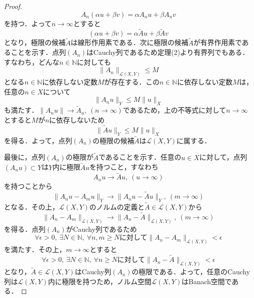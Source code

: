 \documentclass[11pt,a4paper,titlepage]{jsreport}
\theoremstyle{definition}
\begin{document}
\begin{proof}
  \begin{equation*}
    A_n(\alpha u+\beta v) = \alpha A_n u + \beta A_n v
  \end{equation*}
  を持つ．よって$n\rightarrow \infty$とすると
  \begin{equation*}
    (\alpha u+\beta v)=\alpha \tilde{A} u + \beta \tilde{A} v
  \end{equation*}
  となり，極限の候補$\tilde{A}$は線形作用素である．次に極限の候補$\tilde{A}$が有界作用素であることを示す．点列$(A_n)$はCauchy列であるため定理(2)より有界列でもある．すなわち，どんな$n\in \mathbb{N}$に対しても
  \begin{equation*}
    \|A_n\|_{\mathcal{L}(X,Y)} \leq M
  \end{equation*}
  となる$n\in\mathbb{N}$に依存しない定数$M$が存在する．この$n\in\mathbb{N}$に依存しない定数$M$は，任意の$n\in X$について
  \begin{equation*}
    \|A_nu\|_Y \leq M\|u\|_X
  \end{equation*}
  も満たす．$\|A_nu\|\rightarrow\tilde{A}_u,\ (n\rightarrow \infty)$であるため，上の不等式に対して$n\rightarrow \infty$とすると$M$が$n$に依存しないため
  \begin{equation*}
    \|\tilde{A}u\|_Y \leq M\|u\|_X
  \end{equation*}
  を得る．よって，点列$(A_n)$の極限の候補$\tilde{A}$は$\mathcal{L}(X,Y)$に属する．

  最後に，点列$(A_n)$の極限が$\tilde{A}$であることを示す．任意の$u\in X$に対して，点列$(A_nu)\subset Y$は$Y$内に極限$\tilde{A}u$を持つこと，すなわち
  \begin{equation*}
    A_nu\rightarrow \tilde{A}u,\ (u\rightarrow \infty)
  \end{equation*}
  を持つことから
  \begin{equation*}
    \|A_n u- A_m u\|_Y\rightarrow \|A_n u-\tilde{A}u\|_Y,\ (m\rightarrow \infty)
  \end{equation*}
  となる．その上，$\mathcal{L}(X,Y)$のノルムの定義と$\tilde{A}\in\mathcal{L}(X,Y)$から
  \begin{equation*}
    \|A_n-A_m\|_{\mathcal{L}(X,Y)}\rightarrow\|A_n-\tilde{A}\|_{\mathcal{L}(X,Y)},\ (m\rightarrow \infty)
  \end{equation*}
  を得る．点列$(A_n)$がCauchy列であるため
  \begin{equation*}
    \forall \epsilon >0,\ \exists N\in\mathbb{N},\ \forall n,m\geq N に対して\|A_n-A_m\|_{\mathcal{L}(X,Y)}<\epsilon
  \end{equation*}
  を満たす．その上，$m\rightarrow \infty$とすると
  \begin{equation*}
    \forall \epsilon >0,\ \exists N\in\mathbb{N},\ \forall n\geq N に対して\|A_n-\tilde{A}\|_{\mathcal{L}(X,Y)}<\epsilon
  \end{equation*}
  となり，$\tilde{A}\in\mathcal{L}(X,Y)$はCauchy列$(A_n)$の極限である．よって，任意のCauchy列は$\mathcal{L}(X,Y)$内に極限を持つため，ノルム空間$\mathcal{L}(X,Y)$はBanach空間である．
\end{proof}
\end{document}

